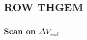 \documentclass[a4paper, 11 pt]{article}
\newcommand{\Vind}{$\Delta V_{ind}$}
\newcommand{\Vthgem}{$\Delta V_{THGEM}$}
\newcommand{\Vdrift}{$ \Delta V_{drift}$}
\newcommand{\ibf}{$I_{bf}$}
\begin{document}

\clearpage

\subsection{ROW THGEM}

\subsubsection{Scan on \Vind}



\end{document}
